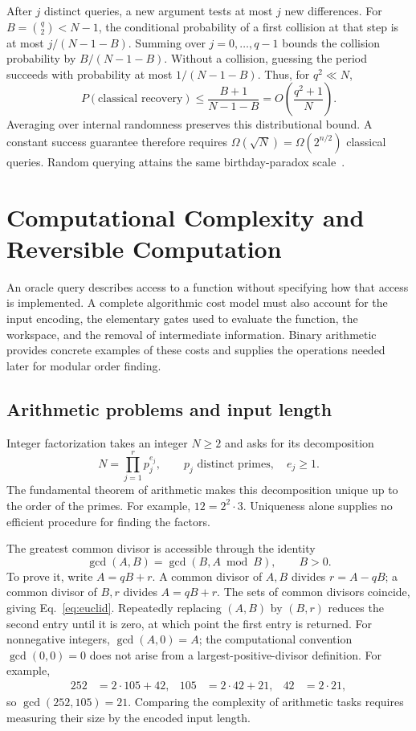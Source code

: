 \documentclass[11pt,oneside,openany]{book}
\theoremstyle{definition}
\begin{document}
After $j$ distinct queries, a new argument tests at most $j$ new differences. For $B=\binom q2<N-1$, the conditional probability of a first collision at that step is at most $j/(N-1-B)$. Summing over $j=0,\ldots,q-1$ bounds the collision probability by $B/(N-1-B)$. Without a collision, guessing the period succeeds with probability at most $1/(N-1-B)$. Thus, for $q^2\ll N$,
\begin{equation}
 P(\text{classical recovery})\le\frac{B+1}{N-1-B}
 =O\!\left(\frac{q^2+1}{N}\right).
 \label{eq:simon-classical-success}
\end{equation}
Averaging over internal randomness preserves this distributional bound. A constant success guarantee therefore requires $\Omega(\sqrt N)=\Omega(2^{n/2})$ classical queries. Random querying attains the same birthday-paradox scale~\cite{Simon1997}.

\chapter{Computational Complexity and Reversible Computation}
\label{chap:cost}

An oracle query describes access to a function without specifying how that access is implemented. A complete algorithmic cost model must also account for the input encoding, the elementary gates used to evaluate the function, the workspace, and the removal of intermediate information. Binary arithmetic provides concrete examples of these costs and supplies the operations needed later for modular order finding.

\section{Arithmetic problems and input length}
Integer factorization takes an integer $N\ge2$ and asks for its decomposition
\begin{equation}
 N=\prod_{j=1}^{r}p_j^{e_j},\qquad
 p_j\text{ distinct primes},\quad e_j\ge1.
\end{equation}
The fundamental theorem of arithmetic makes this decomposition unique up to the order of the primes. For example, $12=2^2\cdot3$. Uniqueness alone supplies no efficient procedure for finding the factors.

The greatest common divisor is accessible through the identity
\begin{equation}
 \gcd(A,B)=\gcd(B,A\bmod B),\qquad B>0.
 \label{eq:euclid}
\end{equation}
To prove it, write $A=qB+r$. A common divisor of $A,B$ divides $r=A-qB$; a common divisor of $B,r$ divides $A=qB+r$. The sets of common divisors coincide, giving Eq.~\eqref{eq:euclid}. Repeatedly replacing $(A,B)$ by $(B,r)$ reduces the second entry until it is zero, at which point the first entry is returned. For nonnegative integers, $\gcd(A,0)=A$; the computational convention $\gcd(0,0)=0$ does not arise from a largest-positive-divisor definition. For example,
\begin{align}
 252&=2\cdot105+42,&105&=2\cdot42+21,&42&=2\cdot21,
\end{align}
so $\gcd(252,105)=21$. Comparing the complexity of arithmetic tasks requires measuring their size by the encoded input length.
\end{document}
